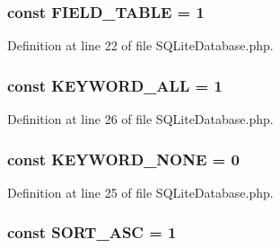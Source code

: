\subsubsection[{F\+I\+E\+L\+D\+\_\+\+T\+A\+B\+L\+E}]{\setlength{\rightskip}{0pt plus 5cm}const F\+I\+E\+L\+D\+\_\+\+T\+A\+B\+L\+E = 1}\label{class_s_q_lite_database_acbdf154a35cfc228dd1016e8aa4bd503}


Definition at line 22 of file S\+Q\+Lite\+Database.\+php.

\hypertarget{class_s_q_lite_database_ababb5c4af464938f3f0b8f9c4fa183ba}{}
\subsubsection[{K\+E\+Y\+W\+O\+R\+D\+\_\+\+A\+L\+L}]{\setlength{\rightskip}{0pt plus 5cm}const K\+E\+Y\+W\+O\+R\+D\+\_\+\+A\+L\+L = 1}\label{class_s_q_lite_database_ababb5c4af464938f3f0b8f9c4fa183ba}


Definition at line 26 of file S\+Q\+Lite\+Database.\+php.

\hypertarget{class_s_q_lite_database_a9b1a24ef01d468c146a71b333edb0c17}{}
\subsubsection[{K\+E\+Y\+W\+O\+R\+D\+\_\+\+N\+O\+N\+E}]{\setlength{\rightskip}{0pt plus 5cm}const K\+E\+Y\+W\+O\+R\+D\+\_\+\+N\+O\+N\+E = 0}\label{class_s_q_lite_database_a9b1a24ef01d468c146a71b333edb0c17}


Definition at line 25 of file S\+Q\+Lite\+Database.\+php.

\hypertarget{class_s_q_lite_database_a9517f2622dfc5fbb0cc64feef247eb06}{}
\subsubsection[{S\+O\+R\+T\+\_\+\+A\+S\+C}]{\setlength{\rightskip}{0pt plus 5cm}const S\+O\+R\+T\+\_\+\+A\+S\+C = 1}\label{class_s_q_lite_database_a9517f2622dfc5fbb0cc64feef247eb06}



